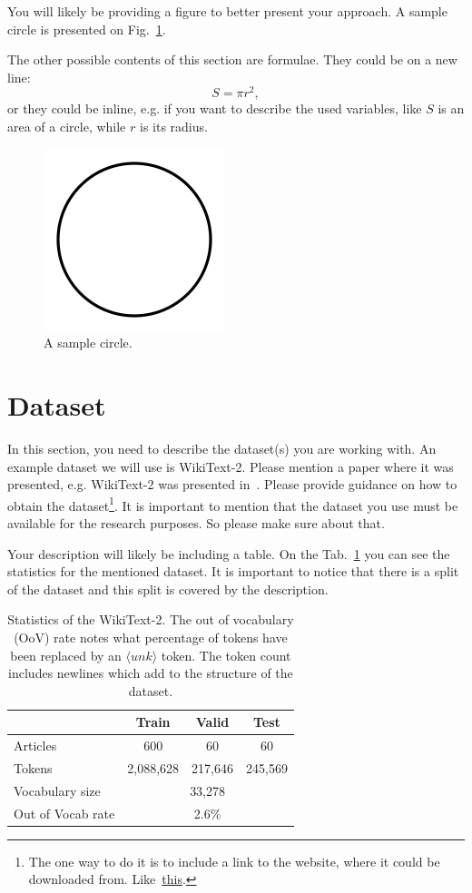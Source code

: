 \documentclass[a4paper,12pt]{article}
\begin{document}
You will likely be providing a figure to better present your approach. A sample circle is presented on Fig.~\ref{fig:circle}.

The other possible contents of this section are formulae. They could be on a new line:
$$S=\pi r^2,$$
or they could be inline, e.g. if you want to describe the used variables, like $S$ is an area of a circle, while $r$ is its radius. 

\begin{figure}[!tbh]
    \centering
    \includegraphics[width=0.3\linewidth]{circle.png}
    \caption{A sample circle.}
    \label{fig:circle}
\end{figure}

\section{Dataset}
In this section, you need to describe the dataset(s) you are working with. 
An example dataset we will use is WikiText-2. Please mention a paper where it was presented, e.g. WikiText-2 was presented in~. Please provide guidance on how to obtain the dataset\footnote{The one way to do it is to include a link to the website, where it could be downloaded from. Like~\href{https://blog.einstein.ai/the-wikitext-long-term-dependency-language-modeling-dataset/}{this}.}. It is important to mention that the dataset you use must be available for the research purposes. So please make sure about that.

Your description will likely be including a table. On the Tab.~\ref{tab:statistics} you can see the statistics for the mentioned dataset. It is important to notice that there is a split of the dataset and this split is covered by the description.

\begin{table}[tbh!]
\begin{center}
\begin{tabular}[t]{|l|ccc|}
\hline
 & Train & Valid & Test \\
\hline
Articles & 600 & 60 & 60  \\
Tokens& 2,088,628 & 217,646 & 245,569 \\
Vocabulary size & \multicolumn{3}{c|}{33,278} \\
Out of Vocab rate &  \multicolumn{3}{c|}{2.6\%}  \\
\hline
\end{tabular}
\caption{Statistics of the WikiText-2. The out of vocabulary (OoV) rate notes what percentage of tokens have been replaced by an $\langle unk \rangle$ token. The token count includes newlines which add to the structure of the dataset.}
\label{tab:statistics}
\end{center}
\end{table}
\end{document}

